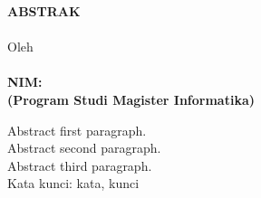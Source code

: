 \clearpage
{}

\begin{spacing}{1}
\begin{center}
  \textbf{\large \MakeUppercase{Abstrak}} \\[2em]

  \textbf{\large \MakeUppercase{\Title}} \\[2em]

  \normalsize \normalfont Oleh\\
  \large \bfseries \AuthorName\\
  NIM:~\uppercase{\AuthorNIM}\\
  (Program Studi Magister Informatika)\\[3em]
\end{center}

Abstract first paragraph.\\

Abstract second paragraph.\\

Abstract third paragraph.\\

\noindent Kata kunci: kata, kunci
\end{spacing}